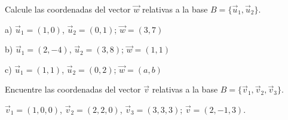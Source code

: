 \begin{exercise}
\item
 Calcule las coordenadas del vector $\vec{w}$ relativas a la base
$B=\{ \vec{u}_1,\vec{u}_2\}$.

a) $\vec{u}_1=(1,0)$, $\vec{u}_2=(0,1)$; $\vec{w}=(3,7)$

b) $\vec{u}_1=(2,-4)$, $\vec{u}_2=(3,8)$; $\vec{w}=(1,1)$

c) $\vec{u}_1=(1,1)$, $\vec{u}_2=(0,2)$; $\vec{w}=(a,b)$\\

\end{exercise}

\begin{exercise}
\item
Encuentre las coordenadas del vector $\vec{v}$ relativas a la base $B=\{
\vec{v}_1,\vec{v}_2,\vec{v}_3\}$.

 $\vec{v}_1=(1,0,0)$, $\vec{v}_2=(2,2,0)$, $\vec{v}_3=(3,3,3)$; $\vec{v}=(2,-1,3)$.\\
\end{exercise}

